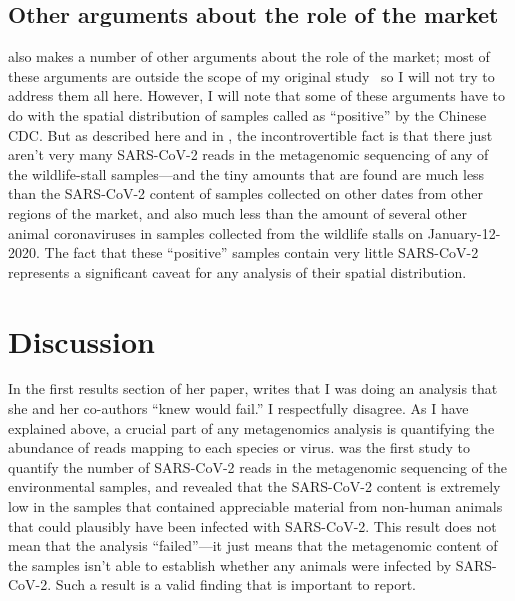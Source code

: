 \documentclass[9pt,onecolumn,twoside]{gsajnl_modified}
\begin{document}
\subsection{Other arguments about the role of the market}
\citet{debarre2024what} also makes a number of other arguments about the role of the market; most of these arguments are outside the scope of my original study~\citep{bloom2023association} so I will not try to address them all here.
However, I will note that some of these arguments have to do with the spatial distribution of samples called as ``positive'' by the Chinese CDC.
But as described here and in \citet{bloom2023association}, the incontrovertible fact is that there just aren't very many SARS-CoV-2 reads in the metagenomic sequencing of any of the wildlife-stall samples---and the tiny amounts that are found are much less than the SARS-CoV-2 content of samples collected on other dates from other regions of the market, and also much less than the amount of several other animal coronaviruses in samples collected from the wildlife stalls on January-12-2020.
The fact that these ``positive'' samples contain very little SARS-CoV-2 represents a significant caveat for any analysis of their spatial distribution.

\section{Discussion}

In the first results section of her paper, \citet{debarre2024what} writes that I was doing an analysis that she and her co-authors ``knew would fail.''
I respectfully disagree.
As I have explained above, a crucial part of any metagenomics analysis is quantifying the abundance of reads mapping to each species or virus.
\citet{bloom2023association} was the first study to quantify the number of SARS-CoV-2 reads in the metagenomic sequencing of the environmental samples, and revealed that the SARS-CoV-2 content is extremely low in the samples that contained appreciable material from non-human animals that could plausibly have been infected with SARS-CoV-2.
This result does not mean that the analysis ``failed''---it just means that the metagenomic content of the samples isn't able to establish whether any animals were infected by SARS-CoV-2.
Such a result is a valid finding that is important to report.
\end{document}
